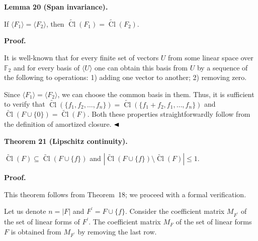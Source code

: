 \documentclass[10pt,a4paper]{article}
\begin{document}
\par\medskip\noindent\textbf{
Lemma 20 (Span invariance).
}\par



If $\langle F_{1}\rangle=\langle F_{2}\rangle$, then $\widetilde{\mathop{\mathrm{Cl}}}(F_{1})=\widetilde{\mathop{\mathrm{Cl}}}(F_{2})$.\par



\par\medskip\noindent\textbf{Proof.}\par


It is well-known that for every finite set of vectors $U$ from some linear space over $\mathbb{F}_{2}$ and for every basis of $\langle U\rangle$ one can obtain this basis from $U$ by a sequence of the following to operations: 1) adding one vector to another; 2) removing zero.\par



Since $\langle F_{1}\rangle=\langle F_{2}\rangle$, we can choose the common basis in them.
Thus, it is sufficient to verify that $\widetilde{\mathop{\mathrm{Cl}}}(\{f_{1},f_{2},\dots,f_{n}\})=\widetilde{\mathop{\mathrm{Cl}}}(\{f_{1}+f_{2},f_{1},\dots,f_{n}\})$ and $\widetilde{\mathop{\mathrm{Cl}}}(F\cup\{0\})=\widetilde{\mathop{\mathrm{Cl}}}(F)$. Both these properties straightforwardly follow from the definition of amortized closure.
$\hfill\blacktriangleleft$\par



\par\medskip\noindent\textbf{
Theorem 21 (Lipschitz continuity).
}\par



$\widetilde{\mathop{\mathrm{Cl}}}(F)\subseteq\widetilde{\mathop{\mathrm{Cl}}}(F\cup\{f\})$ and $|\widetilde{\mathop{\mathrm{Cl}}}(F\cup\{f\})\setminus\widetilde{\mathop{\mathrm{Cl}}}(F)|\leq 1$.\par



\par\medskip\noindent\textbf{Proof.}\par


This theorem follows from Theorem 18; we proceed with a formal verification.\par



Let us denote $n=|F|$ and $F^{\prime}=F\cup\{f\}$. Consider the coefficient matrix $M_{F^{\prime}}$ of the set of linear forms of $F^{\prime}$. The coefficient matrix $M_{F}$ of the set of linear forms $F$ is obtained from $M_{F^{\prime}}$ by removing the last row.\par
\end{document}
